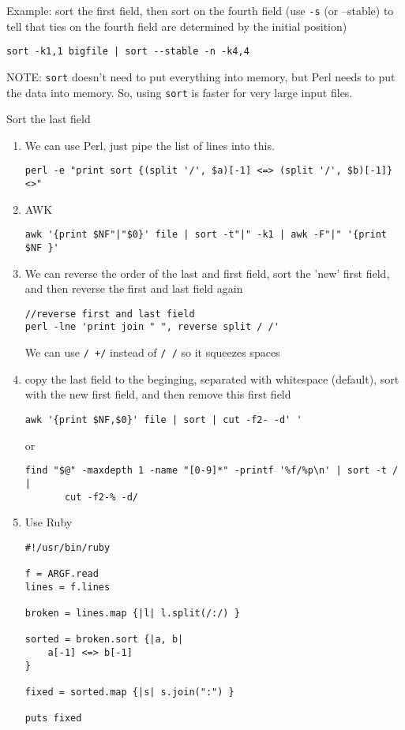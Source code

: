 Example: sort the first field, then sort on the fourth field (use
\verb!-s! (or --stable) to tell that ties on the fourth field are determined by
the initial position)
\begin{verbatim}
sort -k1,1 bigfile | sort --stable -n -k4,4
\end{verbatim}

\begin{framed}
NOTE: \verb!sort! doesn't need to put everything into memory, but Perl needs to
put the data into memory. So, using \verb!sort! is faster for very large input
files.
\end{framed}

Sort the last field
\begin{enumerate}
  \item  We can use Perl, just pipe the list of lines into this.
\begin{verbatim}
perl -e "print sort {(split '/', $a)[-1] <=> (split '/', $b)[-1]} <>"
\end{verbatim}
  
  \item AWK
\begin{verbatim}
awk '{print $NF"|"$0}' file | sort -t"|" -k1 | awk -F"|" '{print $NF }'
\end{verbatim}

  \item We can reverse the order of the last and first field, sort the 'new'
  first field, and then reverse the first and last field again
\begin{verbatim}
//reverse first and last field
perl -lne 'print join " ", reverse split / /'
\end{verbatim}
We can use \verb!/ +/! instead of \verb!/ /! so it squeezes spaces

  \item copy the last field to the beginging, separated with whitespace
  (default), sort with the new first field, and then remove this first field
\begin{verbatim}
awk '{print $NF,$0}' file | sort | cut -f2- -d' '
\end{verbatim}
or
\begin{verbatim}
find "$@" -maxdepth 1 -name "[0-9]*" -printf '%f/%p\n' | sort -t / | 
       cut -f2-% -d/
\end{verbatim}

  \item Use Ruby
\begin{verbatim}
#!/usr/bin/ruby

f = ARGF.read
lines = f.lines

broken = lines.map {|l| l.split(/:/) }

sorted = broken.sort {|a, b|
    a[-1] <=> b[-1]
}

fixed = sorted.map {|s| s.join(":") }

puts fixed
\end{verbatim}
\end{enumerate}

